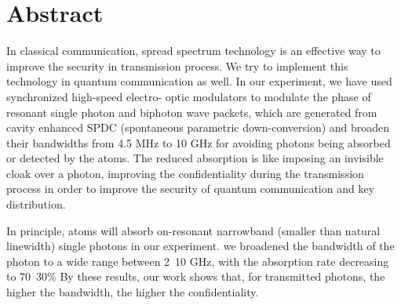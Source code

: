 \documentclass[class=NCU_thesis, crop=false]{standalone}
\begin{document}
\chapter{Abstract}
In classical communication, spread spectrum technology is an effective way to improve the security in transmission process. We try to implement this technology in quantum communication as well. In our experiment, we have used synchronized high-speed electro- optic modulators to modulate the phase of resonant single photon and biphoton wave packets, which are generated from cavity enhanced SPDC (spontaneous parametric down-conversion) and broaden their bandwidths from 4.5 MHz to 10 GHz for avoiding photons being absorbed or detected by the atoms. The reduced absorption is like imposing an invisible cloak over a photon, improving the confidentiality during the transmission process in order to improve the security of quantum communication and key distribution. 

In principle, atoms will absorb on-resonant narrowband (smaller than natural linewidth) single photons in our experiment. we broadened the bandwidth of the photon to a wide range between 2~10 GHz, with the absorption rate decreasing to 70~30\% By these results, our work shows that, for transmitted photons, the higher the bandwidth, the higher the confidentiality.

\vspace{2em}
\end{document}
